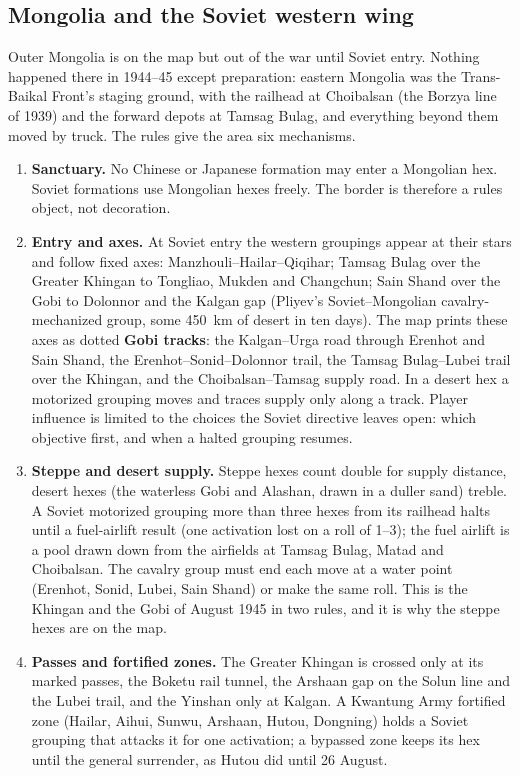 \documentclass[11pt]{article}
\begin{document}
\subsection{Mongolia and the Soviet western wing}
Outer Mongolia is on the map but out of the war until Soviet entry. Nothing happened there in 1944--45 except preparation: eastern Mongolia was the Trans-Baikal Front's staging ground, with the railhead at Choibalsan (the Borzya line of 1939) and the forward depots at Tamsag Bulag, and everything beyond them moved by truck. The rules give the area six mechanisms.
\begin{enumerate}
\item \textbf{Sanctuary.} No Chinese or Japanese formation may enter a Mongolian hex. Soviet formations use Mongolian hexes freely. The border is therefore a rules object, not decoration.
\item \textbf{Entry and axes.} At Soviet entry the western groupings appear at their stars and follow fixed axes: Manzhouli--Hailar--Qiqihar; Tamsag Bulag over the Greater Khingan to Tongliao, Mukden and Changchun; Sain Shand over the Gobi to Dolonnor and the Kalgan gap (Pliyev's Soviet--Mongolian cavalry-mechanized group, some 450~km of desert in ten days). The map prints these axes as dotted \textbf{Gobi tracks}: the Kalgan--Urga road through Erenhot and Sain Shand, the Erenhot--Sonid--Dolonnor trail, the Tamsag Bulag--Lubei trail over the Khingan, and the Choibalsan--Tamsag supply road. In a desert hex a motorized grouping moves and traces supply only along a track. Player influence is limited to the choices the Soviet directive leaves open: which objective first, and when a halted grouping resumes.
\item \textbf{Steppe and desert supply.} Steppe hexes count double for supply distance, desert hexes (the waterless Gobi and Alashan, drawn in a duller sand) treble. A Soviet motorized grouping more than three hexes from its railhead halts until a fuel-airlift result (one activation lost on a roll of 1--3); the fuel airlift is a pool drawn down from the airfields at Tamsag Bulag, Matad and Choibalsan. The cavalry group must end each move at a water point (Erenhot, Sonid, Lubei, Sain Shand) or make the same roll. This is the Khingan and the Gobi of August 1945 in two rules, and it is why the steppe hexes are on the map.
\item \textbf{Passes and fortified zones.} The Greater Khingan is crossed only at its marked passes, the Boketu rail tunnel, the Arshaan gap on the Solun line and the Lubei trail, and the Yinshan only at Kalgan. A Kwantung Army fortified zone (Hailar, Aihui, Sunwu, Arshaan, Hutou, Dongning) holds a Soviet grouping that attacks it for one activation; a bypassed zone keeps its hex until the general surrender, as Hutou did until 26 August.

\end{enumerate}
\end{document}
